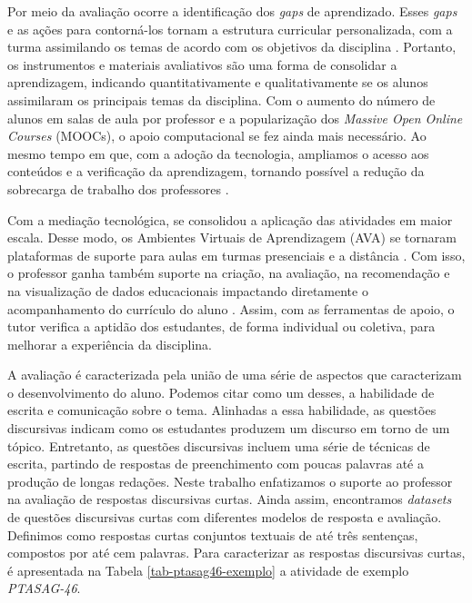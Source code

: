 Por meio da avaliação ocorre a identificação dos \textit{gaps} de aprendizado. Esses \textit{gaps} e as ações para contorná-los tornam a estrutura curricular personalizada, com a turma assimilando os temas de acordo com os objetivos da disciplina \cite{biggs1998}. Portanto, os instrumentos e materiais avaliativos são uma forma de consolidar a aprendizagem, indicando quantitativamente e qualitativamente se os alunos assimilaram os principais temas da disciplina. Com o aumento do número de alunos em salas de aula por professor e a popularização dos \textit{Massive Open Online Courses} (MOOCs), o apoio computacional se fez ainda mais necessário. Ao mesmo tempo em que, com a adoção da tecnologia, ampliamos o acesso aos conteúdos e a verificação da aprendizagem, tornando possível a redução da sobrecarga de trabalho dos professores \cite{dunlap2005}.

Com a mediação tecnológica, se consolidou a aplicação das atividades em maior escala. Desse modo, os Ambientes Virtuais de Aprendizagem (AVA) \cite{maquine2020} se tornaram plataformas de suporte para aulas em turmas presenciais e a distância \cite{raes2020}. Com isso, o professor ganha também suporte na criação, na avaliação, na recomendação e na visualização de dados educacionais impactando diretamente o acompanhamento do currículo do aluno \cite{paiva2012}. Assim, com as ferramentas de apoio, o tutor verifica a aptidão dos estudantes, de forma individual ou coletiva, para melhorar a experiência da disciplina.

A avaliação é caracterizada pela união de uma série de aspectos que caracterizam o desenvolvimento do aluno. Podemos citar como um desses, a habilidade de escrita e comunicação sobre o tema. Alinhadas a essa habilidade, as questões discursivas indicam como os estudantes produzem um discurso em torno de um tópico. Entretanto, as questões discursivas incluem uma série de técnicas de escrita, partindo de respostas de preenchimento com poucas palavras até a produção de longas redações. Neste trabalho enfatizamos o suporte ao professor na avaliação de respostas discursivas curtas. Ainda assim, encontramos \textit{datasets} de questões discursivas curtas com diferentes modelos de resposta e avaliação. Definimos como respostas curtas conjuntos textuais de até três sentenças, compostos por até cem palavras. Para caracterizar as respostas discursivas curtas, é apresentada na Tabela \ref{tab-ptasag46-exemplo} a atividade de exemplo \textit{PTASAG-46}.

